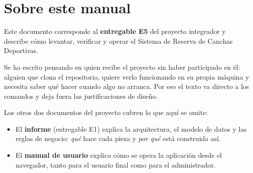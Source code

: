
\section*{Sobre este manual}

Este documento corresponde al \textbf{entregable E5} del proyecto integrador y
describe cómo levantar, verificar y operar el Sistema de Reserva de Canchas
Deportivas.

Se ha escrito pensando en quien recibe el proyecto sin haber participado en él:
alguien que clona el repositorio, quiere verlo funcionando en su propia máquina
y necesita saber qué hacer cuando algo no arranca. Por eso el texto va directo a
los comandos y deja fuera las justificaciones de diseño.

Los otros dos documentos del proyecto cubren lo que aquí se omite:

\begin{itemize}
  \item El \textbf{informe} (entregable E1) explica la arquitectura, el modelo
        de datos y las reglas de negocio: \emph{qué} hace cada pieza y
        \emph{por qué} está construida así.
  \item El \textbf{manual de usuario} explica cómo se opera la aplicación desde
        el navegador, tanto para el usuario final como para el administrador.
\end{itemize}

